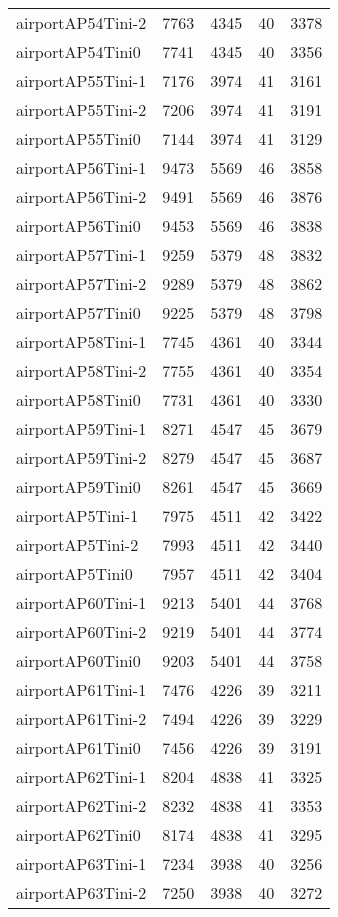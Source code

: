 \begin{longtable}{lrrrr}
airportAP54Tini-2 & 7763 & 4345 & 40 & 3378 \\
airportAP54Tini0 & 7741 & 4345 & 40 & 3356 \\
airportAP55Tini-1 & 7176 & 3974 & 41 & 3161 \\
airportAP55Tini-2 & 7206 & 3974 & 41 & 3191 \\
airportAP55Tini0 & 7144 & 3974 & 41 & 3129 \\
airportAP56Tini-1 & 9473 & 5569 & 46 & 3858 \\
airportAP56Tini-2 & 9491 & 5569 & 46 & 3876 \\
airportAP56Tini0 & 9453 & 5569 & 46 & 3838 \\
airportAP57Tini-1 & 9259 & 5379 & 48 & 3832 \\
airportAP57Tini-2 & 9289 & 5379 & 48 & 3862 \\
airportAP57Tini0 & 9225 & 5379 & 48 & 3798 \\
airportAP58Tini-1 & 7745 & 4361 & 40 & 3344 \\
airportAP58Tini-2 & 7755 & 4361 & 40 & 3354 \\
airportAP58Tini0 & 7731 & 4361 & 40 & 3330 \\
airportAP59Tini-1 & 8271 & 4547 & 45 & 3679 \\
airportAP59Tini-2 & 8279 & 4547 & 45 & 3687 \\
airportAP59Tini0 & 8261 & 4547 & 45 & 3669 \\
airportAP5Tini-1 & 7975 & 4511 & 42 & 3422 \\
airportAP5Tini-2 & 7993 & 4511 & 42 & 3440 \\
airportAP5Tini0 & 7957 & 4511 & 42 & 3404 \\
airportAP60Tini-1 & 9213 & 5401 & 44 & 3768 \\
airportAP60Tini-2 & 9219 & 5401 & 44 & 3774 \\
airportAP60Tini0 & 9203 & 5401 & 44 & 3758 \\
airportAP61Tini-1 & 7476 & 4226 & 39 & 3211 \\
airportAP61Tini-2 & 7494 & 4226 & 39 & 3229 \\
airportAP61Tini0 & 7456 & 4226 & 39 & 3191 \\
airportAP62Tini-1 & 8204 & 4838 & 41 & 3325 \\
airportAP62Tini-2 & 8232 & 4838 & 41 & 3353 \\
airportAP62Tini0 & 8174 & 4838 & 41 & 3295 \\
airportAP63Tini-1 & 7234 & 3938 & 40 & 3256 \\
airportAP63Tini-2 & 7250 & 3938 & 40 & 3272 \\

\end{longtable}
